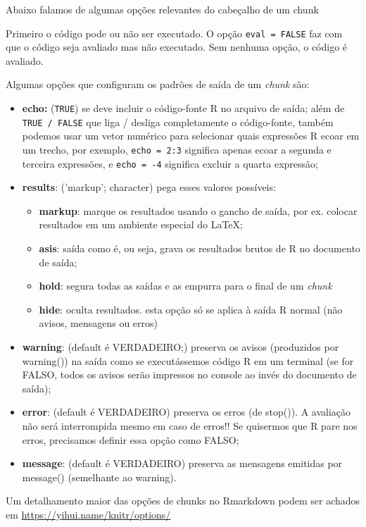 \documentclass[12pt,a4paper,oneside]{erdc}
\begin{document}
	Abaixo falamos de algumas opções relevantes do cabeçalho de um chunk
	
	Primeiro o código pode ou não ser executado. O opção \verb|eval = FALSE| faz com que o código seja avaliado mas não executado. Sem nenhuma opção, o código é avaliado.
	
	Algumas opções que configuram os padrões de saída de um \textit{chunk} são:
	\begin{itemize}
		\item \textbf{echo:} (\verb|TRUE|) se deve incluir o código-fonte R no arquivo de saída; além de \verb|TRUE / FALSE| que liga / desliga completamente o código-fonte, também podemos usar um vetor numérico para selecionar quais expressões R ecoar em um trecho, por exemplo, \verb|echo = 2:3| significa apenas ecoar a segunda e terceira expressões, e \verb|echo = -4| significa excluir a quarta expressão;
		\item \textbf{results}: ('markup'; character) pega esses valores possíveis:
			\begin{itemize}
				\item \textbf{markup}: marque os resultados usando o gancho de saída, por ex. colocar resultados em um ambiente especial do \LaTeX;
				\item \textbf{asis}: saída como é, ou seja, grava os resultados brutos de R no documento de saída;
				\item \textbf{hold}: segura todas as saídas e as empurra para o final de um \textit{chunk}
				\item \textbf{hide}: oculta resultados.  esta opção só se aplica à saída R normal (não avisos, mensagens ou erros)				
			\end{itemize}
		\item \textbf{warning}: (default é VERDADEIRO;) preserva os avisos (produzidos por warning()) na saída como se executássemos código R em um terminal (se for  FALSO, todos os avisos serão impressos no console ao invés do documento de saída);
		\item \textbf{error}: (default é VERDADEIRO) preserva os erros (de stop()). A avaliação não será interrompida mesmo em caso de erros!! Se quisermos que R pare nos erros, precisamos definir essa opção como FALSO;
		\item \textbf{message}: (default é VERDADEIRO) preserva as mensagens emitidas por message() (semelhante ao warning).
	\end{itemize}

	Um detalhamento maior das opções de chunks no Rmarkdown podem ser achados em \url{https://yihui.name/knitr/options/}
	
\end{document}
